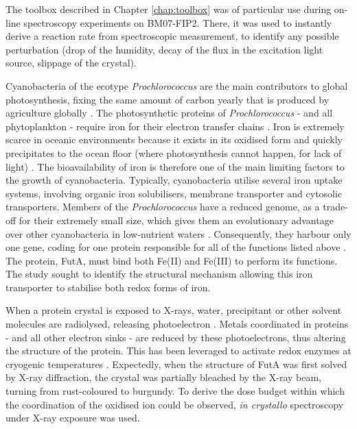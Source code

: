 \vspace{10mm}

The toolbox described in Chapter \ref{chap:toolbox} was of particular use during on-line spectroscopy experiments on BM07-FIP2. There, it was used to instantly derive a reaction rate from spectroscopic measurement, to identify any possible perturbation (drop of the humidity, decay of the flux in the excitation light source, slippage of the crystal).

Cyanobacteria of the ecotype \textit{Prochlorococcus} are the main contributors to global photosynthesis, fixing the same amount of carbon yearly that is produced by agriculture globally \parencite{hustonGlobalDistributionNet2009}. The photosynthetic proteins of \textit{Prochlorococcus} - and all phytoplankton - require iron for their electron transfer chains \parencite{ravenRoleTraceMetals1999}. Iron is extremely scarce in oceanic environments because it exists in its oxidised form and quickly precipitates to the ocean floor (where photosynthesis cannot happen, for lack of light) \parencite{wellsIronChemistrySeawater1995}. The bioavailability of iron is therefore one of the main limiting factors to the growth of cyanobacteria. Typically, cyanobacteria utilise several iron uptake systems, involving organic iron solubilisers, membrane transporter and cytosolic transporters. Members of the \textit{Prochlorococcus} have a reduced genome, as a trade-off for their extremely small size, which gives them an evolutionary advantage over other cyanobacteria in low-nutrient waters \parencite{billerProchlorococcusStructureFunction2015}. Consequently, they harbour only one gene, coding for one protein responsible for all of the functions listed above \parencite{rocapGenomeDivergenceTwo2003}. The protein, FutA, must bind both Fe(II) and Fe(III) to perform its functions. The study sought to identify the structural mechanism allowing this iron transporter to stabilise both redox forms of iron.  


When a protein crystal is exposed to X-rays, water, precipitant or other solvent molecules are radiolysed, releasing photoelectron \parencite{garmanRadiationDamageBiological2023}. Metals coordinated in proteins - and all other electron sinks - are reduced by these photoelectrons, thus altering the structure of the protein. This has been leveraged to activate redox enzymes at cryogenic temperatures \parencite{berglundCatalyticPathwayHorseradish2002,roseSingleCrystalSpectroscopy2022}. Expectedly, when the structure of FutA was first solved by X-ray diffraction, the crystal was partially bleached by the X-ray beam, turning from rust-coloured to burgundy. To derive the dose budget within which the coordination of the oxidised ion could be observed, \textit{in crystallo} spectroscopy under X-ray exposure was used. 

